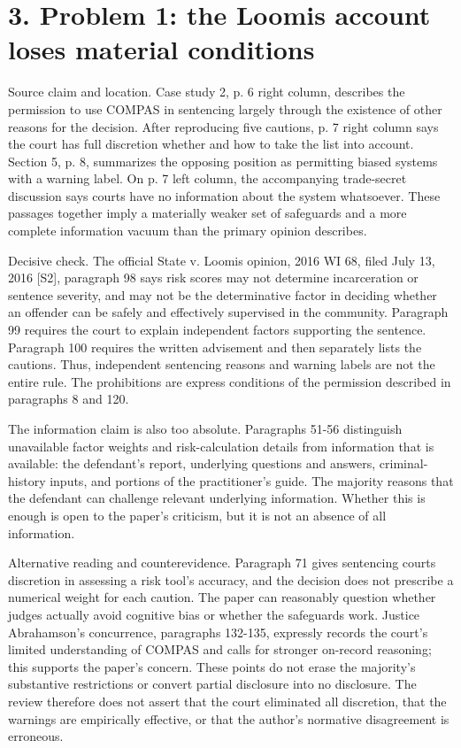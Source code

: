 \documentclass[10pt]{article}
\begin{document}
\section*{3. Problem 1: the Loomis account loses material conditions}
Source claim and location. Case study 2, p. 6 right column, describes the permission to use COMPAS in sentencing largely through the existence of other reasons for the decision. After reproducing five cautions, p. 7 right column says the court has full discretion whether and how to take the list into account. Section 5, p. 8, summarizes the opposing position as permitting biased systems with a warning label. On p. 7 left column, the accompanying trade-secret discussion says courts have no information about the system whatsoever. These passages together imply a materially weaker set of safeguards and a more complete information vacuum than the primary opinion describes.\par
Decisive check. The official State v. Loomis opinion, 2016 WI 68, filed July 13, 2016 [S2], paragraph 98 says risk scores may not determine incarceration or sentence severity, and may not be the determinative factor in deciding whether an offender can be safely and effectively supervised in the community. Paragraph 99 requires the court to explain independent factors supporting the sentence. Paragraph 100 requires the written advisement and then separately lists the cautions. Thus, independent sentencing reasons and warning labels are not the entire rule. The prohibitions are express conditions of the permission described in paragraphs 8 and 120.\par
The information claim is also too absolute. Paragraphs 51-56 distinguish unavailable factor weights and risk-calculation details from information that is available: the defendant’s report, underlying questions and answers, criminal-history inputs, and portions of the practitioner’s guide. The majority reasons that the defendant can challenge relevant underlying information. Whether this is enough is open to the paper’s criticism, but it is not an absence of all information.\par
Alternative reading and counterevidence. Paragraph 71 gives sentencing courts discretion in assessing a risk tool’s accuracy, and the decision does not prescribe a numerical weight for each caution. The paper can reasonably question whether judges actually avoid cognitive bias or whether the safeguards work. Justice Abrahamson’s concurrence, paragraphs 132-135, expressly records the court’s limited understanding of COMPAS and calls for stronger on-record reasoning; this supports the paper’s concern. These points do not erase the majority’s substantive restrictions or convert partial disclosure into no disclosure. The review therefore does not assert that the court eliminated all discretion, that the warnings are empirically effective, or that the author’s normative disagreement is erroneous.\par
\end{document}
